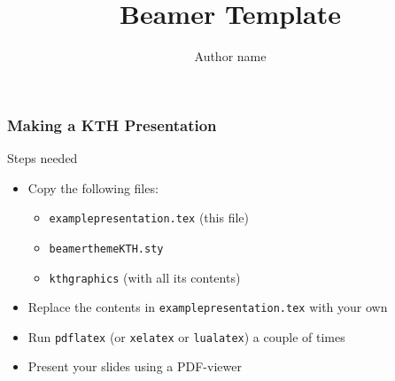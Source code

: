 \documentclass[aspectratio=169]{beamer}
\title{Beamer Template}
\author{Author name}
\begin{document}
\startpage

\begin{frame}[plain]
  \titlepage
\end{frame}


  




\normalpage
\begin{frame}
  \frametitle{Making a KTH Presentation}

  \begin{block}{Steps needed}
    \begin{itemize}
    \item Copy the following files:
    \begin{itemize}
    \item \texttt{examplepresentation.tex} (this file)
    \item \texttt{beamerthemeKTH.sty}
    \item \texttt{kthgraphics} (with all its contents)
    \end{itemize}
    \item Replace the contents in \texttt{examplepresentation.tex} with your own
    \item Run \texttt{pdflatex} (or \texttt{xelatex} or \texttt{lualatex}) a couple of times
    \item Present your slides using a PDF-viewer
    \end{itemize}
  \end{block}

\end{frame}
\end{document}
